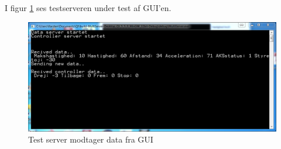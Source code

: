 I figur \ref{fig:testserver} ses testserveren under test af GUI'en. 
\begin{figure}[H]
\centering
\includegraphics[width=\textwidth* 3/4,height=\textwidth* 8/20 ]{../fig/billeder/testserver.png}
\caption{Test server modtager data fra GUI}
\label{fig:testserver}
\end{figure}

\clearpage

